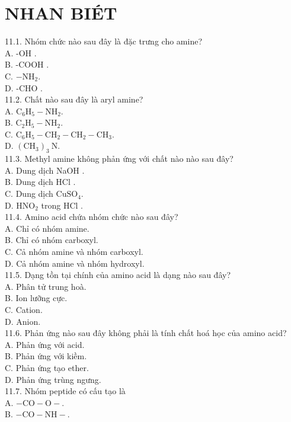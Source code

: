 \documentclass[10pt]{article}
\begin{document}
\section*{NHAN BIÉT}
11.1. Nhóm chức nào sau đây là đặc trưng cho amine?\\
A. -OH .\\
B. -COOH .\\
C. $-\mathrm{NH}_{2}$.\\
D. -CHO .\\
11.2. Chất nào sau đây là aryl amine?\\
A. $\mathrm{C}_{6} \mathrm{H}_{5}-\mathrm{NH}_{2}$.\\
B. $\mathrm{C}_{2} \mathrm{H}_{5}-\mathrm{NH}_{2}$.\\
C. $\mathrm{C}_{6} \mathrm{H}_{5}-\mathrm{CH}_{2}-\mathrm{CH}_{2}-\mathrm{CH}_{3}$.\\
D. $\left(\mathrm{CH}_{3}\right)_{3} \mathrm{~N}$.\\
11.3. Methyl amine không phản ứng với chất nào nào sau đây?\\
A. Dung dịch NaOH .\\
B. Dung dịch HCl .\\
C. Dung dịch $\mathrm{CuSO}_{4}$.\\
D. $\mathrm{HNO}_{2}$ trong HCl .\\
11.4. Amino acid chứa nhóm chức nào sau đây?\\
A. Chỉ có nhóm amine.\\
B. Chỉ có nhóm carboxyl.\\
C. Cả nhóm amine và nhóm carboxyl.\\
D. Cả nhóm amine và nhóm hydroxyl.\\
11.5. Dạng tồn tại chính của amino acid là dạng nào sau đây?\\
A. Phân tử trung hoà.\\
B. Ion lưỡng cực.\\
C. Cation.\\
D. Anion.\\
11.6. Phản ứng nào sau đây không phải là tính chất hoá học của amino acid?\\
A. Phản ứng với acid.\\
B. Phản ứng với kiềm.\\
C. Phản ứng tạo ether.\\
D. Phản ứng trùng ngưng.\\
11.7. Nhóm peptide có cấu tạo là\\
A. $-\mathrm{CO}-\mathrm{O}-$.\\
B. $-\mathrm{CO}-\mathrm{NH}-$.\\
\end{document}
